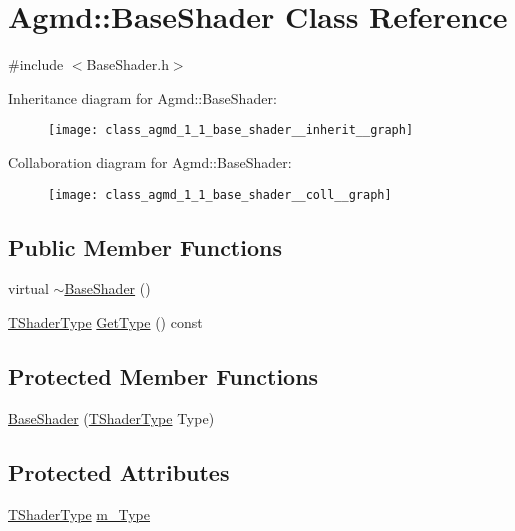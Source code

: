 \hypertarget{class_agmd_1_1_base_shader}{\section{Agmd\+:\+:Base\+Shader Class Reference}
\label{class_agmd_1_1_base_shader}
}


{\ttfamily \#include $<$Base\+Shader.\+h$>$}



Inheritance diagram for Agmd\+:\+:Base\+Shader\+:\nopagebreak
\begin{figure}[H]
\begin{center}
\leavevmode
\texttt{[image: class\_agmd\_1\_1\_base\_shader\_\_inherit\_\_graph]}
\end{center}
\end{figure}


Collaboration diagram for Agmd\+:\+:Base\+Shader\+:\nopagebreak
\begin{figure}[H]
\begin{center}
\leavevmode
\texttt{[image: class\_agmd\_1\_1\_base\_shader\_\_coll\_\_graph]}
\end{center}
\end{figure}
\subsection*{Public Member Functions}
\begin{DoxyCompactItemize}
\item 
virtual \hyperlink{class_agmd_1_1_base_shader_a62d80f920748d1d440b25ca51bb05469}{$\sim$\+Base\+Shader} ()
\item 
\hyperlink{namespace_agmd_a162a493eaff1589f07a505806e6724b4}{T\+Shader\+Type} \hyperlink{class_agmd_1_1_base_shader_aa39144e11d0faae57b40508f084e37a6}{Get\+Type} () const 
\end{DoxyCompactItemize}
\subsection*{Protected Member Functions}
\begin{DoxyCompactItemize}
\item 
\hyperlink{class_agmd_1_1_base_shader_a064e3ca7e2a407faee85c6918d418793}{Base\+Shader} (\hyperlink{namespace_agmd_a162a493eaff1589f07a505806e6724b4}{T\+Shader\+Type} Type)
\end{DoxyCompactItemize}
\subsection*{Protected Attributes}
\begin{DoxyCompactItemize}
\item 
\hyperlink{namespace_agmd_a162a493eaff1589f07a505806e6724b4}{T\+Shader\+Type} \hyperlink{class_agmd_1_1_base_shader_ac0bbd74caaf0776c9a7f030693b8d6ba}{m\+\_\+\+Type}
\end{DoxyCompactItemize}
